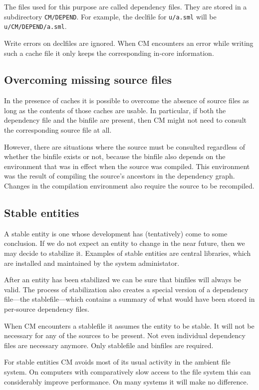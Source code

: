 \documentclass{article}
\begin{document}
The files used for this purpose are called dependency files.  They are
stored in a subdirectory {\tt CM/DEPEND}.  For example, the declfile
for {\tt u/a.sml} will be {\tt u/CM/DEPEND/a.sml}.

Write errors on declfiles are ignored. When CM encounters an error
while writing such a cache file it only keeps the corresponding
in-core information.

\subsection{Overcoming missing source files}

In the presence of caches it is possible to overcome the absence of
source files as long as the contents of those caches are usable.  In
particular, if both the dependency file and the binfile are present,
then CM might not need to consult the corresponding source file at
all.

However, there are situations where the source must be consulted
regardless of whether the binfile exists or not, because the binfile
also depends on the environment that was in effect when the source was
compiled.  This environment was the result of compiling the source's
ancestors in the dependency graph.  Changes in the compilation
environment also require the source to be recompiled.

\subsection{Stable entities}

A stable entity is one whose development has (tentatively) come to
some conclusion.  If we do not expect an entity to change in the near
future, then we may decide to stabilize it.  Examples of stable
entities are central libraries, which are installed and maintained by
the system administator.

After an entity has been stabilized we can be sure that binfiles will
always be valid.  The process of stabilization also creates a special
version of a dependency file---the stablefile---which contains a
summary of what would have been stored in per-source dependency files.

When CM encounters a stablefile it assumes the entity to be stable.
It will not be necessary for any of the sources to be present.  Not
even individual dependency files are necessary anymore.  Only
stablefile and binfiles are required.

For stable entities CM avoids most of its usual activity in the
ambient file system. On computers with comparatively slow access to
the file system this can considerably improve performance.  On many
systems it will make no difference.
\end{document}

